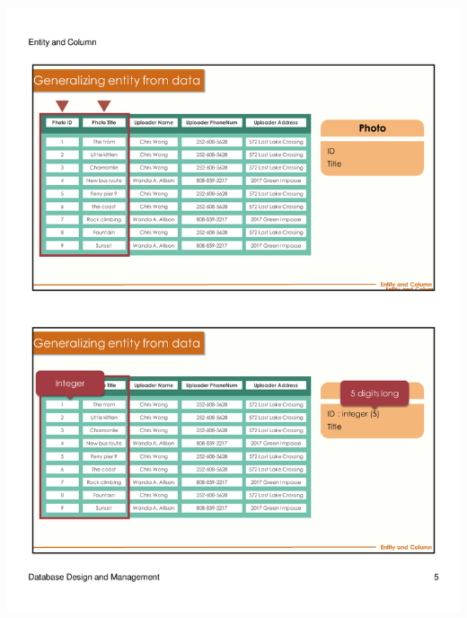 \begin{frame}{ }
    \centering
    \includegraphics[width=\textwidth, trim={10mm 24mm 10mm 134mm}, clip]{resources/02/02_5}
\end{frame}
